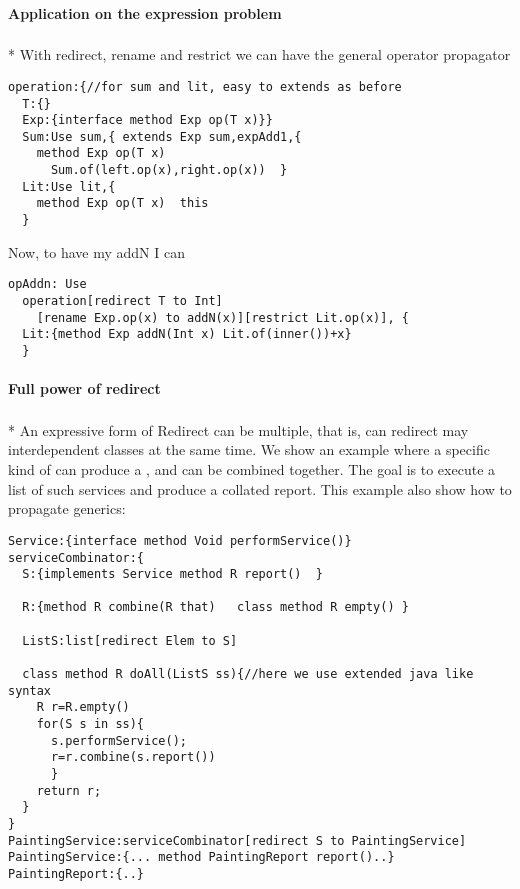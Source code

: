 



\paragraph*{Application on the expression problem}${}_{}$\\*
With redirect, rename and restrict we can have the general operator propagator
\begin{lstlisting}
operation:{//for sum and lit, easy to extends as before
  T:{}
  Exp:{interface method Exp op(T x)}}
  Sum:Use sum,{ extends Exp sum,expAdd1,{
    method Exp op(T x)
      Sum.of(left.op(x),right.op(x))  }
  Lit:Use lit,{
    method Exp op(T x)  this
  }
\end{lstlisting}

Now, to have my addN I can

\begin{lstlisting}
opAddn: Use
  operation[redirect T to Int]
    [rename Exp.op(x) to addN(x)][restrict Lit.op(x)], {
  Lit:{method Exp addN(Int x) Lit.of(inner())+x}
  }
\end{lstlisting}  



\paragraph*{Full power of redirect}${}_{}$\\*
An expressive form of Redirect can be multiple, that is, can redirect may interdependent classes at the same time.
We show an example where a specific kind of \Q@Service@ can produce a \Q@Report@, and 
\Q@Report@s can be combined together.
The goal is to execute a list of such services and produce a collated report.
This example also show how to propagate generics:

\begin{lstlisting}
Service:{interface method Void performService()}
serviceCombinator:{
  S:{implements Service method R report()  }
  
  R:{method R combine(R that)   class method R empty() }
  
  ListS:list[redirect Elem to S]
  
  class method R doAll(ListS ss){//here we use extended java like syntax
    R r=R.empty()
    for(S s in ss){
      s.performService();
      r=r.combine(s.report())
      }
    return r;
  }
}
PaintingService:serviceCombinator[redirect S to PaintingService]
PaintingService:{... method PaintingReport report()..}
PaintingReport:{..}
\end{lstlisting}

